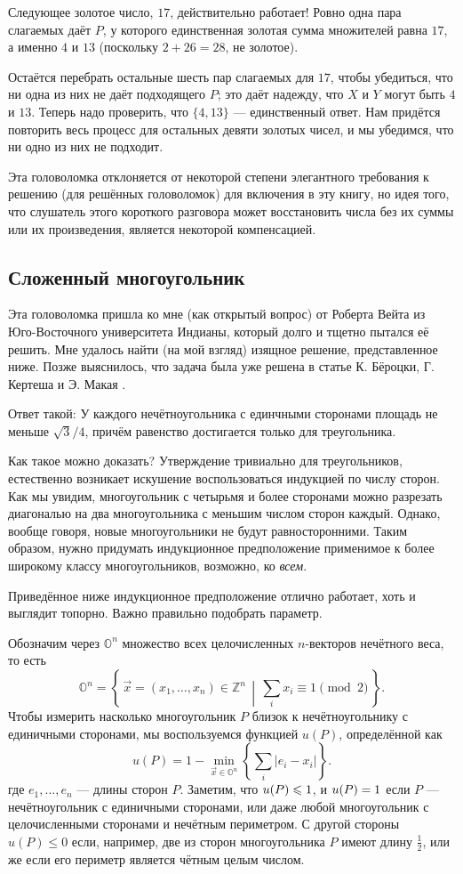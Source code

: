 Следующее золотое число, $17$, действительно работает!
Ровно одна пара слагаемых даёт $P$, у которого единственная золотая сумма множителей равна $17$, а именно $4$ и $13$ (поскольку $2 + 26 = 28$, не золотое).

Остаётся перебрать остальные шесть пар слагаемых для $17$, чтобы убедиться, что ни одна из них не даёт подходящего $P$;
это даёт надежду, что $X$ и $Y$ могут быть $4$ и $13$.
Теперь надо проверить, что $\{4, 13\}$ --- единственный ответ.
Нам придётся повторить весь процесс для остальных девяти золотых чисел, 
и мы убедимся, что ни одно из них не подходит.

Эта головоломка отклоняется от некоторой степени элегантного требования к решению (для решённых головоломок) для включения в эту книгу, но идея того, что слушатель этого короткого разговора может восстановить числа без их суммы или их произведения, является некоторой компенсацией.

\subsection*{Сложенный многоугольник}

Эта головоломка пришла ко мне (как открытый вопрос) от Роберта Вейта из Юго-Восточного университета Индианы, который долго и тщетно пытался её решить.
Мне удалось найти (на мой взгляд) изящное решение, представленное ниже.
Позже выяснилось, что задача была уже решена в статье К. Бёроцки, Г. Кертеша и Э. Макая \cite{9}.

Ответ такой: У каждого нечётноугольника с единчными сторонами площадь не меньше $\sqrt{3}/4$, причём равенство достигается только для треугольника.

Как такое можно доказать?
Утверждение тривиально для треугольников,
естественно возникает искушение воспользоваться индукцией по числу сторон.
Как мы увидим,  многоугольник с четырьмя и более сторонами можно разрезать диагональю на два многоугольника с меньшим числом сторон каждый.
Однако, вообще говоря, новые многоугольники не будут равносторонними.
Таким образом, нужно придумать индукционное предположение применимое к более широкому классу многоугольников, возможно, ко \emph{всем}.

Приведённое ниже индукционное предположение отлично работает, хоть и выглядит топорно.
Важно правильно подобрать параметр.

Обозначим через $\mathbb{O}^n$ множество всех целочисленных $n$-векторов нечётного веса, то есть 
\[\mathbb{O}^n=\left\{\,\vec x=(x_1,\dots,x_n)\in \mathbb{Z}^n\,\middle|\, \sum_ix_i\equiv 1\pmod 2\,\right\}.\]
Чтобы измерить насколько многоугольник $P$ близок к нечётноугольнику с единичными сторонами, мы воспользуемся функцией $u(P)$, определённой как
\[u(P)=1-\min_{\vec x\in \mathbb{O}^n} \left\{\sum_i |e_i-x_i|\right\}.\]
где  $e_1,\dots,e_n$ --- длины сторон $P$.
Заметим, что $u(P)\z\leqslant1$, и $u(P)\z=1$ если $P$ --- нечётноугольник с единичными сторонами, или даже любой многоугольник с целочисленными сторонами и нечётным периметром.
С другой стороны $u(P)\leqslant 0$ если, например, две из сторон многоугольника $P$ имеют длину $\tfrac12$, или же если его периметр является чётным целым числом.

